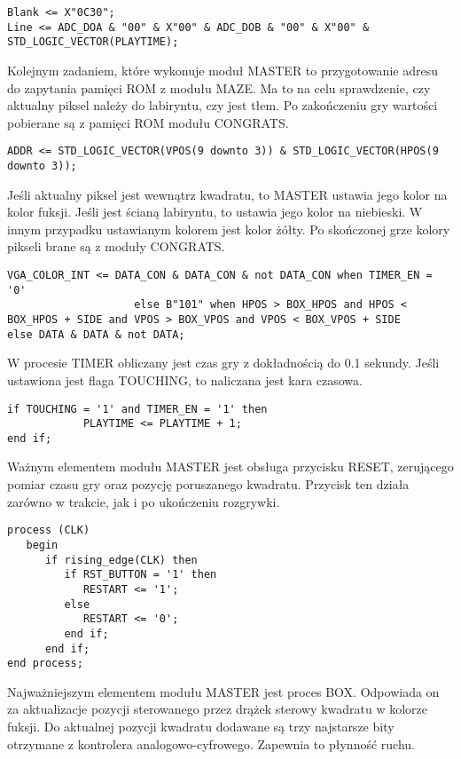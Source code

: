 \documentclass[11pt]{article}
\begin{document}
\begin{lstlisting}
Blank <= X"0C30";
Line <= ADC_DOA & "00" & X"00" & ADC_DOB & "00" & X"00" & STD_LOGIC_VECTOR(PLAYTIME);
\end{lstlisting}	

Kolejnym zadaniem, które wykonuje moduł MASTER to przygotowanie adresu do zapytania pamięci ROM z modułu MAZE.
Ma to na celu sprawdzenie, czy aktualny piksel należy do labiryntu, czy jest tłem.
Po zakończeniu gry wartości pobierane są z pamięci ROM modułu CONGRATS.

\begin{lstlisting}
ADDR <= STD_LOGIC_VECTOR(VPOS(9 downto 3)) & STD_LOGIC_VECTOR(HPOS(9 downto 3));
\end{lstlisting}

Jeśli aktualny piksel jest wewnątrz kwadratu, to MASTER ustawia jego kolor na kolor fuksji.
Jeśli jest ścianą labiryntu, to ustawia jego kolor na niebieski.
W innym przypadku ustawianym kolorem jest kolor żółty.
Po skończonej grze kolory pikseli brane są z moduły CONGRATS.

\begin{lstlisting}
VGA_COLOR_INT <= DATA_CON & DATA_CON & not DATA_CON when TIMER_EN = '0'
                    else B"101" when HPOS > BOX_HPOS and HPOS < BOX_HPOS + SIDE and VPOS > BOX_VPOS and VPOS < BOX_VPOS + SIDE
else DATA & DATA & not DATA;

\end{lstlisting}

W procesie TIMER obliczany jest czas gry z dokładnością do 0.1 sekundy. 
Jeśli ustawiona jest flaga TOUCHING, to naliczana jest kara czasowa.

\begin{lstlisting}
if TOUCHING = '1' and TIMER_EN = '1' then
            PLAYTIME <= PLAYTIME + 1;
end if;
\end{lstlisting}

Ważnym elementem modułu MASTER jest obsługa przycisku RESET, zerującego pomiar czasu gry oraz pozycję poruszanego kwadratu. 
Przycisk ten działa zarówno w trakcie, jak i po ukończeniu rozgrywki. 

\begin{lstlisting}
process (CLK)
   begin
      if rising_edge(CLK) then
         if RST_BUTTON = '1' then
            RESTART <= '1';
         else
            RESTART <= '0';
         end if;
      end if;
end process;
\end{lstlisting}

Najważniejszym elementem modułu MASTER jest proces BOX. 
Odpowiada on za aktualizacje pozycji sterowanego przez drążek sterowy kwadratu w kolorze fuksji.
Do aktualnej pozycji kwadratu dodawane są trzy najstarsze bity otrzymane z kontrolera analogowo-cyfrowego.
Zapewnia to płynność ruchu.
\end{document}
